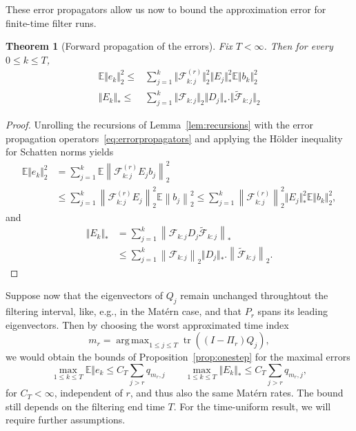 \documentclass[a4paper,12pt]{article}
\newtheorem{theorem}{Theorem}[section]
\begin{document}
These error propagators allow us now to bound the approximation error for finite-time filter runs.
\begin{theorem}[Forward propagation of the errors]\label{thm:fixed-time-error}
    Fix $T < \infty$.
    Then for every $0 \leq k \leq T$,
    \begin{align}
        \mathbb{E} \Vert e_k \Vert_{2}^{2} \leq &
        \sum_{j=1}^{k} \Vert \mathcal{F}_{k:j}^{(r)} \Vert_{2}^{2}
        \Vert E_j \Vert_{*}^{2}
        \mathbb{E} \Vert b_k \Vert_{2}^{2}\\
        \Vert E_k \Vert_* \leq &
        \sum_{j=1}^{k} \Vert \mathcal{F}_{k:j} \Vert_2
        \Vert D_j \Vert_*.
        \Vert \widetilde{\mathcal{F}}_{k:j} \Vert_2
    \end{align}
\end{theorem}
\begin{proof}
    Unrolling the recursions of Lemma~\ref{lem:recursions} with the error propagation operators~\eqref{eq:errorpropagators} and
    applying the Hölder inequality for Schatten norms yields
    \begin{align}
        \mathbb{E} \Vert e_k \Vert_{2}^{2}
        &= \sum_{j=1}^{k} \mathbb{E} \left\lVert \mathcal{F}_{k:j}^{(r)} E_j b_j \right\rVert_{2}^{2}\\
        &\leq \sum_{j=1}^{k}
        \left\lVert \mathcal{F}_{k:j}^{(r)} E_j \right\rVert_{2}^{2}
        \mathbb{E} \left\lVert b_j \right\rVert_{2}^{2}
        \leq \sum_{j=1}^{k} \left\lVert \mathcal{F}_{k:j}^{(r)} \right\rVert_{2}^{2}
        \Vert E_j \Vert_{*}^{2}
        \mathbb{E} \Vert b_k \Vert_{2}^{2},
    \end{align}
    and
    \begin{align}
        \Vert E_k \Vert_*
        &= \sum_{j=1}^{k} \left\lVert \mathcal{F}_{k:j} D_j \widetilde{\mathcal{F}}_{k:j} \right\rVert_{*}\\
        &\leq \sum_{j=1}^{k} \left\lVert \mathcal{F}_{k:j} \right\rVert_2
        \Vert D_j \Vert_*.
        \left\lVert \widetilde{\mathcal{F}}_{k:j} \right\rVert_2.
    \end{align}
\end{proof}
Suppose now that the eigenvectors of $Q_j$ remain unchanged throughtout the filtering interval,
like, e.g., in the Matérn case, and that $P_r$ spans its leading eigenvectors.
Then by choosing the worst approximated time index
\begin{equation}
    m_r = \operatorname{arg\, max}_{1 \leq j \leq T}
    \operatorname{tr}\left( (I-\Pi_r) Q_j \right),
\end{equation}
we would obtain the bounds of Proposition~\ref{prop:onestep} for the maximal errors
\begin{equation}
    \max_{1 \leq k \leq T} \mathbb{E} \Vert e_k \leq C_T \sum_{j > r} q_{m_r,j}
    \qquad \max_{1 \leq k \leq T} \Vert E_k \Vert_* \leq C_T \sum_{j > r} q_{m_r,j},
\end{equation}
for $C_T < \infty$, independent of $r$, and thus also the same Matérn rates.
The bound still depends on the filtering end time $T$.
For the time-uniform result, we will require further assumptions.
\end{document}
